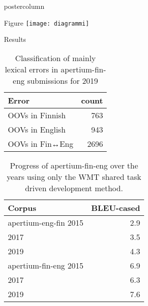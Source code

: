 \documentclass[final,hyperref={pdfpagelabels}]{beamer}
\begin{document}
\begin{frame}
\begin{columns}
\begin{column}{.49\textwidth}
\begin{beamercolorbox}[center,wd=\textwidth]{postercolumn}
\begin{minipage}[T]{.95\textwidth}
{        \begin{block}{Figure}
            \texttt{[image: diagrammi]}
        \end{block}

        \begin{block}{Results}

\begin{table}
\begin{center}
    \begin{tabular}{lr}
        \toprule
        Error & count \\
        \midrule
        OOVs in Finnish & 763 \\
        OOVs in English & 943 \\
        OOVs in Fin↔Eng & 2696 \\
        \bottomrule
    \end{tabular}
    \caption{Classification of mainly lexical errors in apertium-fin-eng
    submissions for 2019\label{table:errors}}
\end{center}
\end{table}


\begin{table}
\begin{center}
    \begin{tabular}{lr}
        \toprule
        \bf Corpus & BLEU-cased  \\
        \midrule
        apertium-eng-fin 2015 & 2.9 \\
        \hfill 2017 & 3.5  \\
        \hfill 2019 & 4.3  \\
        \midrule
        apertium-fin-eng 2015 & 6.9\\
        \hfill 2017 & 6.3 \\
        \hfill 2019 & 7.6 \\
        \bottomrule
    \end{tabular}
    \caption{Progress of apertium-fin-eng over the years using only the WMT
    shared task driven development method.\label{table:progress}}
\end{center}
\end{table}

        \end{block}

}
\end{minipage}
\end{beamercolorbox}
\end{column}
\end{columns}
\end{frame}
\end{document}
